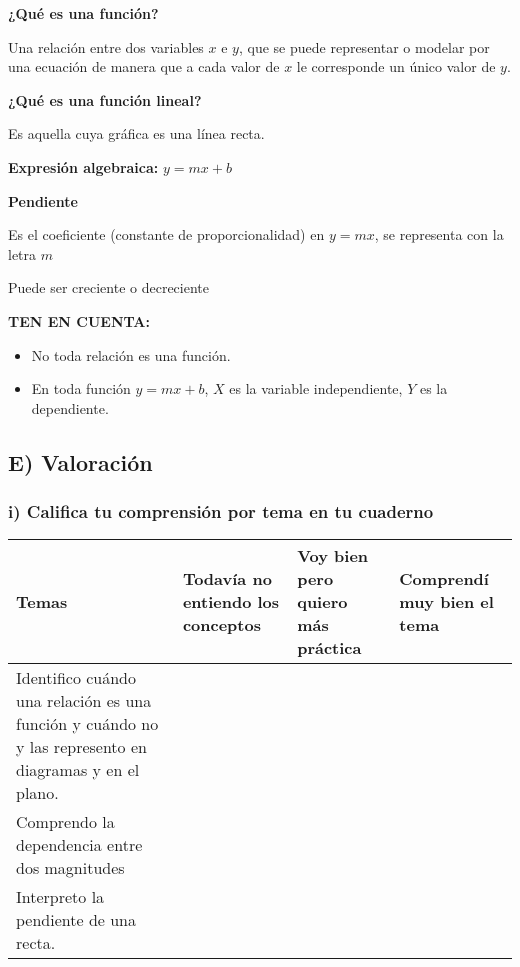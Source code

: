 \documentclass[12pt,a4paper]{article}
\begin{document}
\begin{tcolorbox}[colback=fondoazul,colframe=azuloscuro]

\textbf{¿Qué es una función?}

Una relación entre dos variables $x$ e $y$, que se puede representar o modelar por una ecuación de manera que a cada valor de $x$ le corresponde un único valor de $y$.

\vspace{0.5cm}

\textbf{¿Qué es una función lineal?}

Es aquella cuya gráfica es una línea recta.

\textbf{Expresión algebraica:} $y = mx + b$

\vspace{0.5cm}

\textbf{Pendiente}

Es el coeficiente (constante de proporcionalidad) en $y = mx$, se representa con la letra $m$

Puede ser creciente o decreciente

\vspace{0.5cm}

\textbf{TEN EN CUENTA:}

\begin{itemize}
\item No toda relación es una función.
\item En toda función $y = mx + b$, $X$ es la variable independiente, $Y$ es la dependiente.
\end{itemize}

\end{tcolorbox}

\vspace{5mm}


\subsection*{E) Valoración}

\subsubsection*{i) Califica tu comprensión por tema en tu cuaderno}

\begin{center}
\small
\begin{tabular}{|
		>{\centering\arraybackslash}m{3.5cm}|
		>{\centering\arraybackslash}m{3cm}|
		>{\centering\arraybackslash}m{3cm}|
		>{\centering\arraybackslash}m{3cm}|}
\hline
\textbf{Temas} & \textbf{Todavía no entiendo los conceptos} & \textbf{Voy bien pero quiero más práctica} & \textbf{Comprendí muy bien el tema} \\
\hline
Identifico cuándo una relación es una función y cuándo no y las represento en diagramas y en el plano. & & & \\
\hline
Comprendo la dependencia entre dos magnitudes & & & \\
\hline
Interpreto la pendiente de una recta. & & & \\
\hline
\end{tabular}
\end{center}
\end{document}
